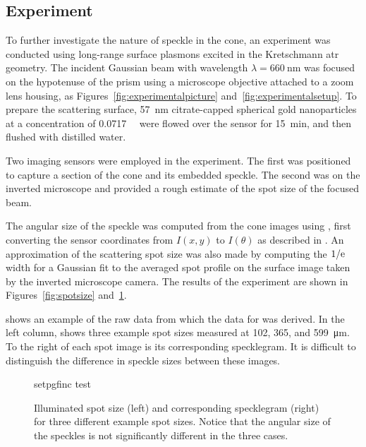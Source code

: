 \subsection{Experiment}\label{sec:specklesizeexpf}
To further investigate the nature of speckle in the cone, an experiment was
conducted using long-range surface plasmons excited in the Kretschmann \gls{atr}
geometry.  The incident Gaussian beam with wavelength $\lambda =
\SI{660}{\nano\meter}$ was focused on the hypotenuse of the prism using a
microscope objective attached to a zoom lens housing, as
Figures~\ref{fig:experimentalpicture} and~\ref{fig:experimentalsetup}.  To
prepare the scattering surface, \SI{57}{\nano\meter} citrate-capped spherical
gold nanoparticles at a concentration of \SI{0.0717}{\nano\Molar} were flowed
over the sensor for \SI{15}{\minute}, and then flushed with distilled
water.

Two imaging sensors were employed in the experiment.  The first was positioned
to capture a section of the cone and its embedded speckle.  The second was on
the inverted microscope and provided a rough estimate of the spot size of the
focused beam.

The angular size of the speckle was computed from the cone images using
, first converting the sensor coordinates from $I(x,y)$
to $I(\theta)$ as described in .  An approximation of the
scattering spot size was also made by computing the $1/{\mathrm{e}}$ width for a
Gaussian fit to the averaged spot profile on the surface image taken by the
inverted microscope camera.  The results of the experiment are shown in
Figures~\ref{fig:spotsize} and~\ref{fig:spotsizewspeckle}.

 shows an example of the raw data from which the
data for  was derived.  In the left column,
 shows three example spot sizes measured at 102,
365, and \SI{599}{\micro\meter}.  To the right of each spot image is its
corresponding specklegram.  It is difficult to distinguish the difference in
speckle sizes between these images.
\begin{figure}[ht]
\centering
{setpgfinc}
{test}
\caption{Illuminated spot size (left) and corresponding specklegram (right)
for three different example spot sizes.  Notice that the angular size of the
speckles is not significantly different in the three cases.}
\label{fig:spotsizewspeckle}
\end{figure}

